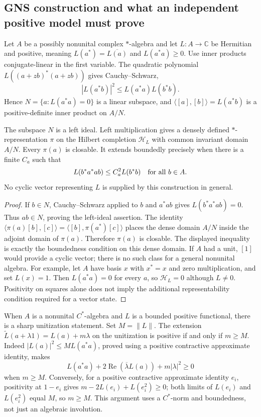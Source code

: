 \subsection{GNS construction and what an independent positive model must prove}
\label{syn-arith:gns}
Let $A$ be a possibly nonunital complex $*$-algebra and let $L:A\to\mathbb C$
be Hermitian and positive, meaning
$L(a^*)=\overline{L(a)}$ and $L(a^*a)\geq0$.
Use inner products conjugate-linear in the first variable.
The quadratic polynomial $L((a+zb)^*(a+zb))$ gives Cauchy--Schwarz,
\[
 |L(a^*b)|^2\leq L(a^*a)L(b^*b).
\]
Hence $N=\{a:L(a^*a)=0\}$ is a linear subspace, and
$\langle[a],[b]\rangle=L(a^*b)$ is a positive-definite inner product on $A/N$.

\begin{proposition}
\label{syn-arith:nonunital-gns}
The subspace $N$ is a left ideal.  Left multiplication gives a densely
defined $*$-representation $\pi$ on the Hilbert completion $\mathcal H_L$
with common invariant domain $A/N$.  Every $\pi(a)$ is closable.
It extends boundedly precisely when there is a finite $C_a$ such that
\[
 L(b^*a^*ab)\leq C_a^2L(b^*b)\quad\hbox{for all }b\in A.
\]
No cyclic vector representing $L$ is supplied by this construction in general.
\end{proposition}
\begin{proof}
If $b\in N$, Cauchy--Schwarz applied to $b$ and $a^*ab$ gives
$L(b^*a^*ab)=0$.  Thus $ab\in N$, proving the left-ideal assertion.
The identity
$\langle\pi(a)[b],[c]\rangle=\langle[b],\pi(a^*)[c]\rangle$
places the dense domain $A/N$ inside the adjoint domain of $\pi(a)$.
Therefore $\pi(a)$ is closable.  The displayed inequality is exactly the
boundedness condition on this dense domain.
If $A$ had a unit, $[1]$ would provide a cyclic vector; there is no such class
for a general nonunital algebra.
For example, let $A$ have basis $x$ with $x^*=x$ and zero multiplication,
and set $L(x)=1$.  Then $L(a^*a)=0$ for every $a$, so $\mathcal H_L=0$
although $L\ne0$.  Positivity on squares alone does not imply the additional
representability condition required for a vector state.
\end{proof}

When $A$ is a nonunital $C^*$-algebra and $L$ is a bounded positive functional,
there is a sharp unitization statement.  Set $M=\|L\|$.
The extension $\widetilde L(a+\lambda1)=L(a)+m\lambda$ on the unitization
is positive if and only if $m\geq M$.
Indeed $|L(a)|^2\leq M L(a^*a)$, proved using a positive contractive
approximate identity, makes
\[
 L(a^*a)+2\operatorname{Re}(\overline\lambda L(a))+m|\lambda|^2\geq0
\]
when $m\geq M$.  Conversely, for a positive contractive approximate identity
$e_i$, positivity at $1-e_i$ gives
$m-2L(e_i)+L(e_i^2)\geq0$; both limits of $L(e_i)$ and $L(e_i^2)$ equal
$M$, so $m\geq M$.
This argument uses a $C^*$-norm and boundedness, not just an algebraic
involution.

